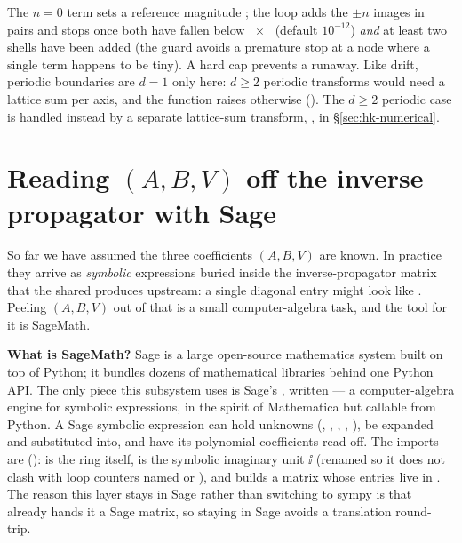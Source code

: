 The $n=0$ term  sets a reference magnitude ; the loop adds
the $\pm n$ images in pairs and stops once both have fallen below
~$\times$~ (default $10^{-12}$) \emph{and} at least two
shells have been added (the  guard avoids a premature stop at a
node where a single term happens to be tiny). A hard cap 
prevents a runaway. Like drift, periodic boundaries are $d=1$ only here:
$d\ge 2$ periodic transforms would need a lattice sum per axis, and the function
raises otherwise (). The $d\ge 2$ periodic case
is handled instead by a separate lattice-sum transform, , in \S\ref{sec:hk-numerical}.

\section{Reading $(A,B,V)$ off the inverse propagator with Sage}\label{sec:hk-extract}

So far we have assumed the three coefficients $(A,B,V)$ are known. In practice
they arrive as \emph{symbolic} expressions buried inside the inverse-propagator
matrix  that the shared  produces upstream:
a single diagonal entry might look like
. Peeling
$(A,B,V)$ out of that is a small computer-algebra task, and the tool for it is
SageMath.

\begin{note}
\textbf{What is SageMath?} Sage is a large open-source mathematics system built
on top of Python; it bundles dozens of mathematical libraries behind one Python
API. The only piece this subsystem uses is Sage's , written
 --- a computer-algebra engine for symbolic expressions, in the spirit
of Mathematica but callable from Python. A Sage symbolic expression can hold
unknowns (, , , , ), be
expanded and substituted into, and have its polynomial coefficients read off.
The imports are 
():  is the ring itself,  is the
symbolic imaginary unit $\ii$ (renamed so it does not clash with loop counters
named  or ), and  builds a matrix whose entries
live in . The reason this layer stays in Sage rather than switching to
sympy is that  already hands it a Sage matrix, so
staying in Sage avoids a translation round-trip.
\end{note}

